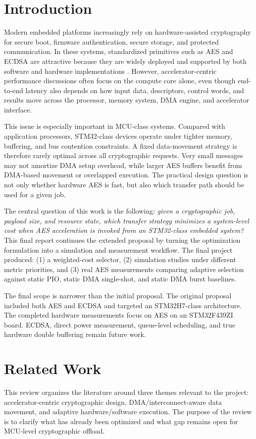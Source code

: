 \documentclass[conference]{IEEEtran}
\begin{document}
\section{Introduction}
Modern embedded platforms increasingly rely on hardware-assisted cryptography for secure boot, firmware authentication, secure storage, and protected communication. In these systems, standardized primitives such as AES and ECDSA are attractive because they are widely deployed and supported by both software and hardware implementations \cite{fips197,fips1865}. However, accelerator-centric performance discussions often focus on the compute core alone, even though end-to-end latency also depends on how input data, descriptors, control words, and results move across the processor, memory system, DMA engine, and accelerator interface.

This issue is especially important in MCU-class systems. Compared with application processors, STM32-class devices operate under tighter memory, buffering, and bus contention constraints. A fixed data-movement strategy is therefore rarely optimal across all cryptographic requests. Very small messages may not amortize DMA setup overhead, while larger AES buffers benefit from DMA-based movement or overlapped execution. The practical design question is not only whether hardware AES is fast, but also which transfer path should be used for a given job.

The central question of this work is the following: \emph{given a cryptographic job, payload size, and resource state, which transfer strategy minimizes a system-level cost when AES acceleration is invoked from an STM32-class embedded system?} This final report continues the extended proposal by turning the optimization formulation into a simulation and measurement workflow. The final project produced: (1) a weighted-cost selector, (2) simulation studies under different metric priorities, and (3) real AES measurements comparing adaptive selection against static PIO, static DMA single-shot, and static DMA burst baselines.

The final scope is narrower than the initial proposal. The original proposal included both AES and ECDSA and targeted an STM32H7-class architecture. The completed hardware measurements focus on AES on an STM32F439ZI board. ECDSA, direct power measurement, queue-level scheduling, and true hardware double buffering remain future work.

\section{Related Work}
This review organizes the literature around three themes relevant to the project: accelerator-centric cryptographic design, DMA/interconnect-aware data movement, and adaptive hardware/software execution. The purpose of the review is to clarify what has already been optimized and what gap remains open for MCU-level cryptographic offload.
\end{document}
